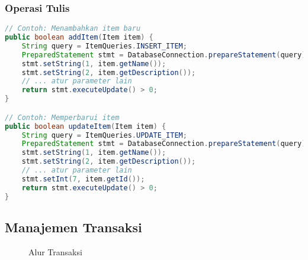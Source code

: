 \documentclass[12pt,a4paper]{article}
\begin{document}
\subsubsection{Operasi Tulis}
\begin{lstlisting}[language=Java]
// Contoh: Menambahkan item baru
public boolean addItem(Item item) {
    String query = ItemQueries.INSERT_ITEM;
    PreparedStatement stmt = DatabaseConnection.prepareStatement(query);
    stmt.setString(1, item.getName());
    stmt.setString(2, item.getDescription());
    // ... atur parameter lain
    return stmt.executeUpdate() > 0;
}

// Contoh: Memperbarui item
public boolean updateItem(Item item) {
    String query = ItemQueries.UPDATE_ITEM;
    PreparedStatement stmt = DatabaseConnection.prepareStatement(query);
    stmt.setString(1, item.getName());
    stmt.setString(2, item.getDescription());
    // ... atur parameter lain
    stmt.setInt(7, item.getId());
    return stmt.executeUpdate() > 0;
}
\end{lstlisting}

\subsection{Manajemen Transaksi}

\begin{figure}[h]
\centering
{}
\caption{Alur Transaksi}
\end{figure}
\end{document}
